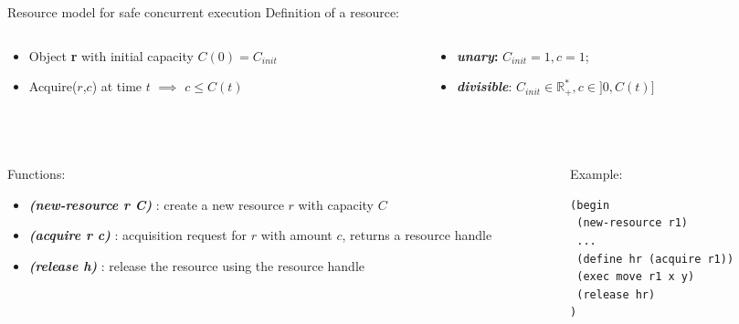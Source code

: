 \begin{frame}[fragile]{Resource model for safe concurrent execution}
    Definition of a resource:
    \begin{columns}
        \begin{column}{0.5\textwidth}
            \begin{itemize}
                \item Object \textbf{r} with initial capacity $C(0) = C_{init} $
                \item Acquire($r$,$c$) at time $t$ $\implies$ $c \leq C(t)$ 
            \end{itemize}
        \end{column}
        \pause
        \begin{column}{0.5\textwidth}
            \begin{itemize}
                \item \textbf{\textit{unary}:} $C_{init} = 1, c = 1$;
                \item \textbf{\textit{divisible}}: $C_{init} \in  \mathbb{R}_+^*, c \in ]0, C(t)]$
            \end{itemize}
        \end{column}
    \end{columns}
    
    ~~

\pause
    \begin{columns}
        \begin{column}{0.6\textwidth}
            Functions:
            \begin{itemize}
                \item \textbf{\textit{(new-resource r C)}} : create a new resource $r$ with capacity $C$
                \item \textbf{\textit{(acquire r c)}} : acquisition request for $r$ with amount $c$, returns a resource handle
                \item \textbf{\textit{(release h)}} : release the resource using the resource handle
            \end{itemize}
        \end{column}
        \pause
        \begin{column}{0.4\textwidth}
        Example: 
            \small
            \lstset{columns=fullflexible}
            \begin{lstlisting}[language = lisp]
(begin
 (new-resource r1)
 ...
 (define hr (acquire r1))
 (exec move r1 x y)
 (release hr)
)
            \end{lstlisting}
        \end{column}
    \end{columns}
\end{frame}

